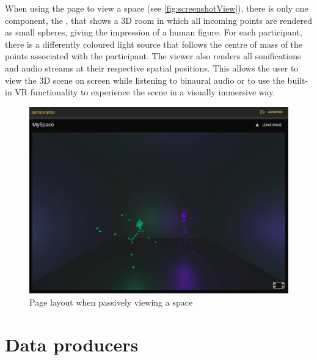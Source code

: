 When using the page to view a space  (see \autoref{fig:screenshotView}), there is only one component, the , that shows a \ac{3D} room in which all incoming points are rendered as small spheres, giving the impression of a human figure.
For each participant, there is a differently coloured light source that follows the centre of mass of the points associated with the participant.
The viewer also renders all sonifications and audio streams at their respective spatial positions.
This allows the user to view the \ac{3D} scene on screen while listening to binaural audio or to use the built-in \ac{VR} functionality to experience the scene in a visually immersive way.

\begin{figure}[!ht]
\centering
\includegraphics[width=\textwidth]{04_Artefakte/01_Abbildungen/screenshot-view}
\caption[View space page screenshot]{Page layout when passively viewing a space\protect}
\label{fig:screenshotView}
\end{figure}

\section{Data producers}
\label{sec:data-producers}

